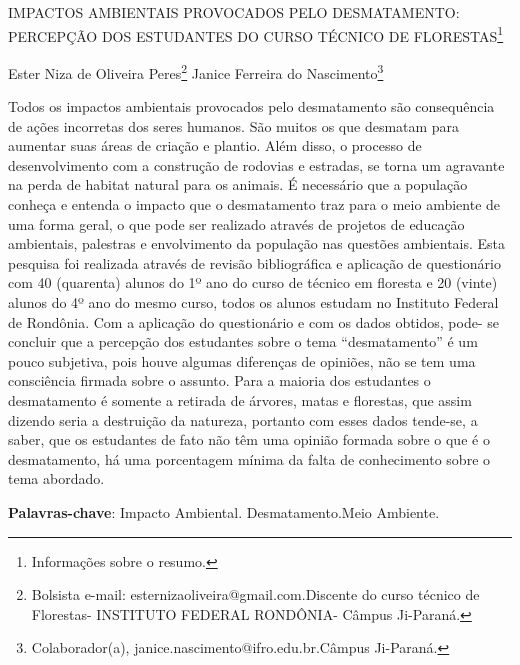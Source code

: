 \documentclass[article,12pt,onesidea,4paper,english,brazil]{abntex2}
\begin{document}
	
	
	\frenchspacing 
	
	\begin{center}
		\LARGE IMPACTOS AMBIENTAIS PROVOCADOS PELO DESMATAMENTO: PERCEPÇÃO DOS ESTUDANTES DO CURSO TÉCNICO DE FLORESTAS\footnote{Informações sobre o resumo.}
		
		\normalsize
	Ester Niza de Oliveira Peres\footnote{Bolsista e-mail: esternizaoliveira@gmail.com.Discente do curso técnico de Florestas-
		INSTITUTO FEDERAL RONDÔNIA- Câmpus Ji-Paraná.} 
		Janice Ferreira do Nascimento\footnote{Colaborador(a), janice.nascimento@ifro.edu.br.Câmpus Ji-Paraná.} 
	\end{center}
	
	\noindent Todos os impactos ambientais provocados pelo desmatamento são consequência de
	ações incorretas dos seres humanos. São muitos os que desmatam para aumentar
	suas áreas de criação e plantio. Além disso, o processo de desenvolvimento com a
	construção de rodovias e estradas, se torna um agravante na perda de habitat
	natural para os animais. É necessário que a população conheça e entenda o
	impacto que o desmatamento traz para o meio ambiente de uma forma geral, o que
	pode ser realizado através de projetos de educação ambientais, palestras e
	envolvimento da população nas questões ambientais. Esta pesquisa foi realizada
	através de revisão bibliográfica e aplicação de questionário com 40 (quarenta)
	alunos do 1º ano do curso de técnico em floresta e 20 (vinte) alunos do 4º ano do
	mesmo curso, todos os alunos estudam no Instituto Federal de Rondônia. Com a
	aplicação do questionário e com os dados obtidos, pode- se concluir que a
	percepção dos estudantes sobre o tema “desmatamento” é um pouco subjetiva, pois
	houve algumas diferenças de opiniões, não se tem uma consciência firmada sobre o
	assunto. Para a maioria dos estudantes o desmatamento é somente a retirada de
	árvores, matas e florestas, que assim dizendo seria a destruição da natureza,
	portanto com esses dados tende-se, a saber, que os estudantes de fato não têm
	uma opinião formada sobre o que é o desmatamento, há uma porcentagem mínima
	da falta de conhecimento sobre o tema abordado.
	
	\vspace{\onelineskip}
	
	\noindent
	\textbf{Palavras-chave}: Impacto Ambiental. Desmatamento.Meio Ambiente.
	
\end{document}
